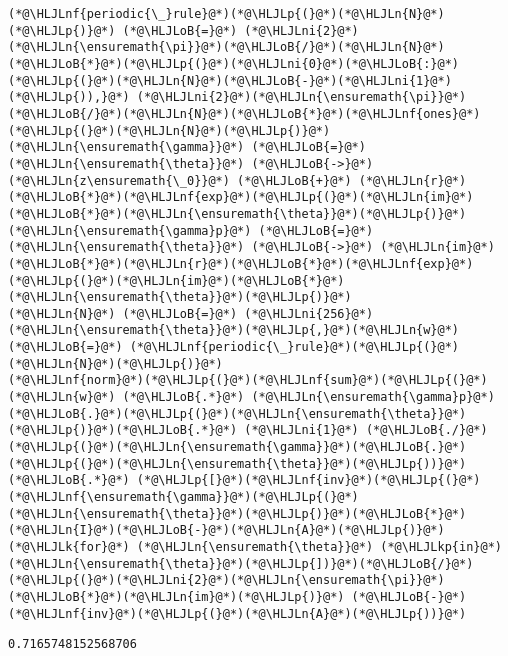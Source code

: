 \documentclass[12pt,a4paper]{article}
\newcommand{\HLJLk}[1]{\textcolor[RGB]{148,91,176}{\textbf{#1}}}
\newcommand{\HLJLkp}[1]{\textcolor[RGB]{148,91,176}{\textbf{#1}}}
\newcommand{\HLJLn}[1]{#1}
\newcommand{\HLJLnf}[1]{\textcolor[RGB]{66,102,213}{#1}}
\newcommand{\HLJLni}[1]{\textcolor[RGB]{59,151,46}{#1}}
\newcommand{\HLJLoB}[1]{\textcolor[RGB]{102,102,102}{\textbf{#1}}}
\newcommand{\HLJLp}[1]{#1}
\begin{document}
\begin{lstlisting}
(*@\HLJLnf{periodic{\_}rule}@*)(*@\HLJLp{(}@*)(*@\HLJLn{N}@*)(*@\HLJLp{)}@*) (*@\HLJLoB{=}@*) (*@\HLJLni{2}@*)(*@\HLJLn{\ensuremath{\pi}}@*)(*@\HLJLoB{/}@*)(*@\HLJLn{N}@*)(*@\HLJLoB{*}@*)(*@\HLJLp{(}@*)(*@\HLJLni{0}@*)(*@\HLJLoB{:}@*)(*@\HLJLp{(}@*)(*@\HLJLn{N}@*)(*@\HLJLoB{-}@*)(*@\HLJLni{1}@*)(*@\HLJLp{)),}@*) (*@\HLJLni{2}@*)(*@\HLJLn{\ensuremath{\pi}}@*)(*@\HLJLoB{/}@*)(*@\HLJLn{N}@*)(*@\HLJLoB{*}@*)(*@\HLJLnf{ones}@*)(*@\HLJLp{(}@*)(*@\HLJLn{N}@*)(*@\HLJLp{)}@*)
(*@\HLJLn{\ensuremath{\gamma}}@*) (*@\HLJLoB{=}@*) (*@\HLJLn{\ensuremath{\theta}}@*) (*@\HLJLoB{->}@*) (*@\HLJLn{z\ensuremath{\_0}}@*) (*@\HLJLoB{+}@*) (*@\HLJLn{r}@*)(*@\HLJLoB{*}@*)(*@\HLJLnf{exp}@*)(*@\HLJLp{(}@*)(*@\HLJLn{im}@*)(*@\HLJLoB{*}@*)(*@\HLJLn{\ensuremath{\theta}}@*)(*@\HLJLp{)}@*)
(*@\HLJLn{\ensuremath{\gamma}p}@*) (*@\HLJLoB{=}@*) (*@\HLJLn{\ensuremath{\theta}}@*) (*@\HLJLoB{->}@*) (*@\HLJLn{im}@*)(*@\HLJLoB{*}@*)(*@\HLJLn{r}@*)(*@\HLJLoB{*}@*)(*@\HLJLnf{exp}@*)(*@\HLJLp{(}@*)(*@\HLJLn{im}@*)(*@\HLJLoB{*}@*)(*@\HLJLn{\ensuremath{\theta}}@*)(*@\HLJLp{)}@*)
(*@\HLJLn{N}@*) (*@\HLJLoB{=}@*) (*@\HLJLni{256}@*)
(*@\HLJLn{\ensuremath{\theta}}@*)(*@\HLJLp{,}@*)(*@\HLJLn{w}@*) (*@\HLJLoB{=}@*) (*@\HLJLnf{periodic{\_}rule}@*)(*@\HLJLp{(}@*)(*@\HLJLn{N}@*)(*@\HLJLp{)}@*)
(*@\HLJLnf{norm}@*)(*@\HLJLp{(}@*)(*@\HLJLnf{sum}@*)(*@\HLJLp{(}@*)(*@\HLJLn{w}@*) (*@\HLJLoB{.*}@*) (*@\HLJLn{\ensuremath{\gamma}p}@*)(*@\HLJLoB{.}@*)(*@\HLJLp{(}@*)(*@\HLJLn{\ensuremath{\theta}}@*)(*@\HLJLp{)}@*)(*@\HLJLoB{.*}@*) (*@\HLJLni{1}@*) (*@\HLJLoB{./}@*)(*@\HLJLp{(}@*)(*@\HLJLn{\ensuremath{\gamma}}@*)(*@\HLJLoB{.}@*)(*@\HLJLp{(}@*)(*@\HLJLn{\ensuremath{\theta}}@*)(*@\HLJLp{))}@*) (*@\HLJLoB{.*}@*) (*@\HLJLp{[}@*)(*@\HLJLnf{inv}@*)(*@\HLJLp{(}@*)(*@\HLJLnf{\ensuremath{\gamma}}@*)(*@\HLJLp{(}@*)(*@\HLJLn{\ensuremath{\theta}}@*)(*@\HLJLp{)}@*)(*@\HLJLoB{*}@*)(*@\HLJLn{I}@*)(*@\HLJLoB{-}@*)(*@\HLJLn{A}@*)(*@\HLJLp{)}@*) (*@\HLJLk{for}@*) (*@\HLJLn{\ensuremath{\theta}}@*) (*@\HLJLkp{in}@*) (*@\HLJLn{\ensuremath{\theta}}@*)(*@\HLJLp{])}@*)(*@\HLJLoB{/}@*)(*@\HLJLp{(}@*)(*@\HLJLni{2}@*)(*@\HLJLn{\ensuremath{\pi}}@*)(*@\HLJLoB{*}@*)(*@\HLJLn{im}@*)(*@\HLJLp{)}@*) (*@\HLJLoB{-}@*) (*@\HLJLnf{inv}@*)(*@\HLJLp{(}@*)(*@\HLJLn{A}@*)(*@\HLJLp{))}@*)
\end{lstlisting}

\begin{lstlisting}
0.7165748152568706
\end{lstlisting}
\end{document}
